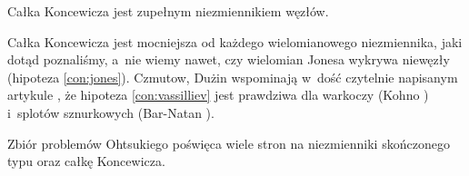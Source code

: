 \begin{conjecture}
    \label{con:vassilliev}
    Całka Koncewicza jest zupełnym niezmiennikiem węzłów.
\end{conjecture}

Całka Koncewicza jest mocniejsza od każdego wielomianowego niezmiennika, jaki dotąd poznaliśmy, a~nie wiemy nawet, czy wielomian Jonesa wykrywa niewęzły (hipoteza \ref{con:jones}).
%
Czmutow, Dużin wspominają w~dość czytelnie napisanym artykule \cite{chmutov2005}, że hipoteza \ref{con:vassilliev} jest prawdziwa dla warkoczy (Kohno \cite{kohno1987}) i~splotów sznurkowych (Bar-Natan \cite{barnatandror1995}).
%
%
%
%
%
%

Zbiór problemów Ohtsukiego \cite[s. 398-444]{ohtsuki2002} poświęca wiele stron na niezmienniki skończonego typu oraz całkę Koncewicza.

%

